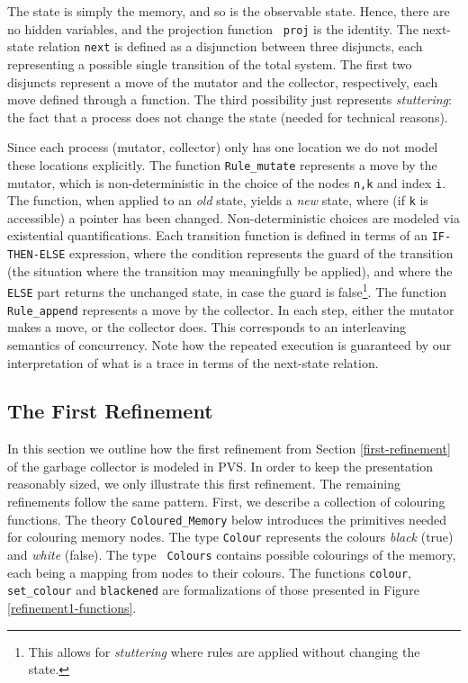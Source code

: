 The state   is simply the memory,  and   so is the observable   state. 
Hence, there are no hidden variables, and the projection function {\tt
  proj} is the identity.      The next-state relation {\tt next}    is
defined as a disjunction between three  disjuncts, each representing a
possible single   transition  of the   total  system.   The  first two
disjuncts represent   a  move  of  the  mutator  and   the  collector,
respectively,  each  move defined  through   a  function.  The   third
possibility just represents {\em stuttering}: the  fact that a process
does not change the state (needed for technical reasons)\@.

Since each process (mutator, collector) only has one location we do not
model these  locations explicitly.    The function {\tt  Rule\_mutate}
represents a move by  the mutator, which  is non-deterministic  in the
choice of the nodes {\tt  n,k} and index  {\tt i}\@.  The function, when
applied to an {\em old\/} state, yields a {\em new\/} state, where (if
{\tt k} is accessible) a  pointer has been changed.  Non-deterministic
choices are modeled via existential quantifications.  Each transition
function is   defined in terms  of  an  {\tt IF-THEN-ELSE} expression,
where the   condition represents the    guard of the  transition  (the
situation where the transition may meaningfully be applied), and where
the {\tt ELSE} part returns the unchanged state, in  case the guard is
false\footnote{This  allows for   {\em  stuttering}  where  rules  are
  applied   without  changing    the  state.}\@.    The function    {\tt
  Rule\_append} represents a  move by  the  collector.  In each  step,
either  the mutator   makes  a move,   or the   collector  does.  This
corresponds to an interleaving semantics of concurrency.  Note how the
repeated execution is  guaranteed by our  interpretation of what  is a
trace in terms of the next-state relation.


\subsection{The First Refinement}

In this  section  we outline  how the  first refinement   from 
Section \ref{first-refinement} of the garbage  collector is  modeled 
in PVS.  
In order to keep the presentation reasonably sized, we only illustrate
this  first refinement.  The    remaining refinements follow the  same
pattern. First, we describe a collection of  colouring functions.  The
theory {\tt Coloured\_Memory}  below introduces the primitives  needed
for  colouring memory  nodes.  The  type  {\tt Colour} represents  the
colours {\em black\/} (true) and {\em white\/} (false)\@.   The type {\tt
Colours} 
contains possible colourings  of the memory,  each being a mapping from
nodes to their colours.  The functions {\tt colour}, {\tt set\_colour}
and  {\tt blackened} are  formalizations of those  presented in Figure \ref{refinement1-functions}.

